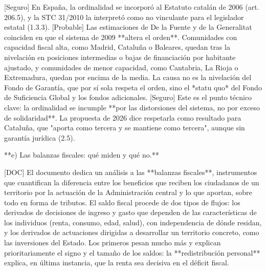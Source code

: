 \documentclass[10pt,a4paper]{article}
\begin{document}
[Seguro] En España, la ordinalidad se incorporó al Estatuto catalán de 2006 (art. 206.5), y la STC 31/2010 la interpretó como no vinculante para el legislador estatal (1.3.3). [Probable] Las estimaciones de De la Fuente y de la Generalitat coinciden en que el sistema de 2009 **altera el orden**. Comunidades con capacidad fiscal alta, como Madrid, Cataluña o Baleares, quedan tras la nivelación en posiciones intermedias o bajas de financiación por habitante ajustado, y comunidades de menor capacidad, como Cantabria, La Rioja o Extremadura, quedan por encima de la media. La causa no es la nivelación del Fondo de Garantía, que por sí sola respeta el orden, sino el *statu quo* del Fondo de Suficiencia Global y los fondos adicionales. [Seguro] Este es el punto técnico clave: la ordinalidad se incumple **por las distorsiones del sistema, no por exceso de solidaridad**. La propuesta de 2026 dice respetarla como resultado para Cataluña, que "aporta como tercera y se mantiene como tercera", aunque sin garantía jurídica (2.5).

**e) Las balanzas fiscales: qué miden y qué no.**

[DOC] El documento dedica un análisis a las **balanzas fiscales**, instrumentos que cuantifican la diferencia entre los beneficios que reciben los ciudadanos de un territorio por la actuación de la Administración central y lo que aportan, sobre todo en forma de tributos. El saldo fiscal procede de dos tipos de flujos: los derivados de decisiones de ingreso y gasto que dependen de las características de los individuos (renta, consumo, edad, salud), con independencia de dónde residan, y los derivados de actuaciones dirigidas a desarrollar un territorio concreto, como las inversiones del Estado. Los primeros pesan mucho más y explican prioritariamente el signo y el tamaño de los saldos: la **redistribución personal** explica, en última instancia, que la renta sea decisiva en el déficit fiscal.
\end{document}
